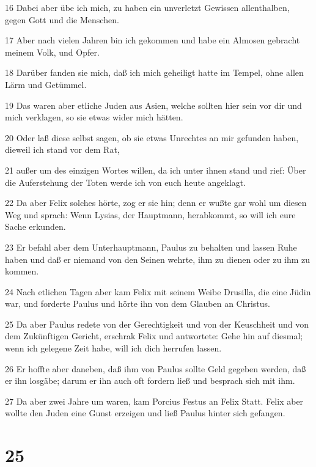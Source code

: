 \par 16 Dabei aber übe ich mich, zu haben ein unverletzt Gewissen allenthalben, gegen Gott und die Menschen.
\par 17 Aber nach vielen Jahren bin ich gekommen und habe ein Almosen gebracht meinem Volk, und Opfer.
\par 18 Darüber fanden sie mich, daß ich mich geheiligt hatte im Tempel, ohne allen Lärm und Getümmel.
\par 19 Das waren aber etliche Juden aus Asien, welche sollten hier sein vor dir und mich verklagen, so sie etwas wider mich hätten.
\par 20 Oder laß diese selbst sagen, ob sie etwas Unrechtes an mir gefunden haben, dieweil ich stand vor dem Rat,
\par 21 außer um des einzigen Wortes willen, da ich unter ihnen stand und rief: Über die Auferstehung der Toten werde ich von euch heute angeklagt.
\par 22 Da aber Felix solches hörte, zog er sie hin; denn er wußte gar wohl um diesen Weg und sprach: Wenn Lysias, der Hauptmann, herabkommt, so will ich eure Sache erkunden.
\par 23 Er befahl aber dem Unterhauptmann, Paulus zu behalten und lassen Ruhe haben und daß er niemand von den Seinen wehrte, ihm zu dienen oder zu ihm zu kommen.
\par 24 Nach etlichen Tagen aber kam Felix mit seinem Weibe Drusilla, die eine Jüdin war, und forderte Paulus und hörte ihn von dem Glauben an Christus.
\par 25 Da aber Paulus redete von der Gerechtigkeit und von der Keuschheit und von dem Zukünftigen Gericht, erschrak Felix und antwortete: Gehe hin auf diesmal; wenn ich gelegene Zeit habe, will ich dich herrufen lassen.
\par 26 Er hoffte aber daneben, daß ihm von Paulus sollte Geld gegeben werden, daß er ihn losgäbe; darum er ihn auch oft fordern ließ und besprach sich mit ihm.
\par 27 Da aber zwei Jahre um waren, kam Porcius Festus an Felix Statt. Felix aber wollte den Juden eine Gunst erzeigen und ließ Paulus hinter sich gefangen.

\chapter{25}

